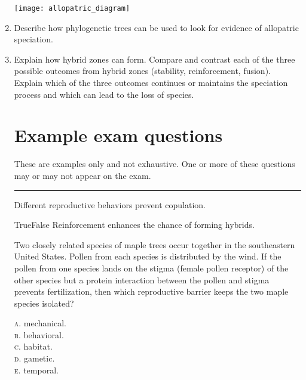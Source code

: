\documentclass[letterpaper]{tufte-handout}
\begin{document}
\begin{enumerate}
	\begin{marginfigure}%
		\centering\texttt{[image: allopatric\_diagram]}
	\end{marginfigure}

	
	\item Describe how phylogenetic trees can be used to look for evidence of allopatric speciation.
	
	\item Explain how hybrid zones can form. Compare and contrast each of the three possible outcomes from hybrid zones (stability, reinforcement, fusion). Explain which of the three outcomes continues or maintains the speciation process and which can lead to the loss of species.
	

\section*{Example exam questions}

These are examples only and not exhaustive. One or more of these questions may or may not appear on the exam.

\bigskip

\noindent \rule{1in}{0.4pt} Different reproductive behaviors prevent copulation.

\bigskip

\noindent True\hspace{1em}False\hspace{1em} Reinforcement enhances the chance of forming hybrids.

\bigskip

\noindent Two closely related species of maple trees occur together in the southeastern United States.  Pollen from each species is distributed by the wind.  If the pollen from one species lands on the stigma (female pollen receptor) of the other species but a protein interaction between the pollen and stigma prevents fertilization, then which reproductive barrier keeps the two maple species isolated?

\smallskip

\noindent \textsc{a}. mechanical.\\
\noindent \textsc{b}. behavioral. \\
\noindent \textsc{c}. habitat. \\
\noindent \textsc{d}. gametic. \\
\noindent \textsc{e}. temporal.


\end{enumerate}
\end{document}
